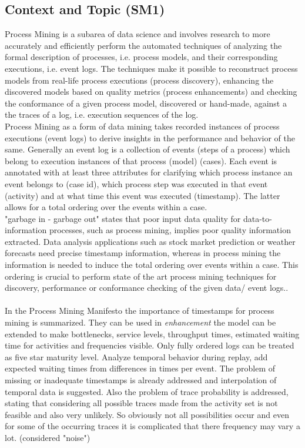 \documentclass[
	a4paper,
	pagesize,
	pdftex,
	12pt,
	ngerman,
	fleqn,
	final,
	]{scrartcl}
\theoremstyle{plain}
\theoremstyle{definition}
\begin{document}
	\subsection{Context and Topic (SM1)}\label{sec:introduction::topic}
	Process Mining is a subarea of data science and involves research to more accurately and efficiently perform the automated techniques of analyzing the formal description of processes, i.e. process models, and their corresponding executions, i.e. event logs. The techniques make it possible to reconstruct process models from real-life process executions (process discovery), enhancing the discovered models based on quality metrics (process enhancements) and checking the conformance of a given process model, discovered or hand-made, against a the traces of a log, i.e. execution sequences of the log. \cite{AalstWilvander2016Pm:d} \cite{accorsi2012exploitation}\\
	Process Mining as a form of data mining takes recorded instances of process executions (event logs) to derive insights in the performance and behavior of the same. Generally an event log is a collection of events (steps of a process) which belong to execution instances of that process (model) (cases). Each event is annotated with at least three attributes for clarifying which process instance an event belongs to (case id), which process step was executed in that event (activity) and at what time this event was executed (timestamp). The latter allows for a total ordering over the events within a case.  \cite{dixit2018detection}	\\
	"garbage in - garbage out" states that poor input data quality for data-to-information processes, such as process mining, implies poor quality information extracted. Data analysis applications such as stock market prediction or weather forecasts need precise timestamp information, whereas in process mining the information is needed to induce the total ordering over events within a case. This ordering is crucial to perform state of the art process mining techniques for discovery, performance or conformance checking of the given data/ event logs.\cite{dixit2018detection}. \\
	\\
	In the Process Mining Manifesto \cite{van2011process} the importance of timestamps for process mining is summarized. They can be used in \textit{enhancement} the model can be extended to make bottlenecks, service levels, throughput times, estimated waiting time for activities and frequencies visible. Only fully ordered logs can be treated as five star maturity level. Analyze temporal behavior during replay, add expected waiting times from differences in times per event. The problem of missing or inadequate timestamps is already addressed and interpolation of temporal data is suggested. Also the problem of trace probability is addressed, stating that considering all possible traces made from the activity set is not feasible and also very unlikely. So obviously not all possibilities occur and even for some of the occurring traces it is complicated that there frequency may vary a lot. (considered "noise")\cite{van2011process} \\
\end{document}
